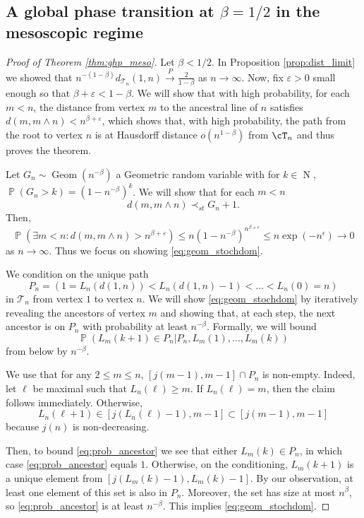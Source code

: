 \documentclass[letterpaper,11pt,reqno]{amsart}
\theoremstyle{definition}
\renewcommand{\le}{\leqslant}
\renewcommand{\ge}{\geqslant}
\DeclareMathOperator{\pr}{\mathds{P}}
\DeclareMathOperator{\N}{N}
\newcommand{\convp}{\stackrel{P}{\longrightarrow}}
\begin{document}
\subsection{A global phase transition at $\beta=1/2$ in the mesoscopic regime}
{%


\begin{proof}[Proof of Theorem \ref{thm:ghp_meso}]
Let $\beta<1/2$. In Proposition \ref{prop:dist_limit} we showed that $n^{-(1-\beta)}d_{\mathcal{T}_n}(1,n)\convp \frac{2}{1-\beta}$ as $n\to\infty$.
Now, fix $\varepsilon>0$ small enough so that $\beta+\varepsilon<1-\beta$. We will show that with high probability, for each $m<n$, the distance from vertex $m$ to the ancestral line of $n$ satisfies $d(m,m\wedge n)<n^{\beta+\varepsilon}$, which shows that, with high probability, the path from the root to vertex $n$ is at Hausdorff distance $o(n^{1-\beta})$ from $\cT_n$ and thus proves the theorem. 

Let $G_n\sim \operatorname{Geom}(n^{-\beta})$ a Geometric random variable with for $k\in \N$, $\pr(G_n>k)=(1-n^{-\beta})^k$. We will show that for each $m<n$ \begin{equation}\label{eq:geom_stochdom}d(m,m\wedge n)\prec_{st}G_n+1.\end{equation} 
Then, 
\[\pr\left(\exists m<n: d(m,m\wedge n)>n^{\beta+\varepsilon} \right) \le n (1-n^{-\beta})^{n^{\beta+\epsilon}}\le n\exp(-n^\epsilon)\to 0\]
as $n\to \infty$. Thus we focus on showing \eqref{eq:geom_stochdom}. 

We condition on the unique path
\[P_n=(1=L_n(d(1,n))<L_n(d(1,n)-1)<\dots< L_n(0)=n)\] in $\mathcal{T}_n$ from vertex $1$ to vertex $n$. We will show \eqref{eq:geom_stochdom} by iteratively revealing the ancestors of vertex $m$ and showing that, at each step, the next ancestor is on $P_n$ with probability at least $n^{-\beta}$. Formally, we will bound
\begin{equation}\label{eq:prob_ancestor} \pr(L_m(k+1)\in P_n | P_n, L_m(1), \dots, L_m(k))\end{equation}
from below by $n^{-\beta}$.

We use that for any $2\le m\le n$, $[j(m-1), m-1]\cap P_n$ is non-empty. Indeed, let $\ell$ be maximal such that $L_n(\ell)\ge m$. If $L_n(\ell)=m$, then the claim follows immediately. Otherwise, \[L_n(\ell+1)\in [j(L_n(\ell)-1) ,  m-1]\subset [j(m-1), m-1]  \] because $j(n)$ is non-decreasing. 

Then, to bound \eqref{eq:prob_ancestor} we see that either $L_m(k)\in P_n$, in which case \eqref{eq:prob_ancestor} equals $1$. Otherwise, on the conditioning, $L_m(k+1)$ is a unique element from $[j(L_m(k)-1), L_m(k)-1]$. By our observation, at least one element of this set is also in $P_n$. Moreover, the set has size at most $n^{\beta}$, so \eqref{eq:prob_ancestor} is at least $n^{-\beta}$. This implies \eqref{eq:geom_stochdom}. 


\end{proof}}
\end{document}
